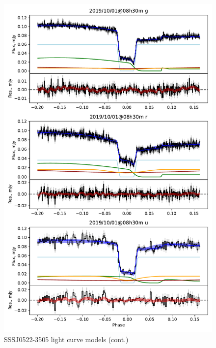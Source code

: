\begin{figure}
    \centering
    \includegraphics[width=\textwidth]{figures/results/three_cvs_with_weird_colours/SSS111126/SSS111126_2.pdf}
    \caption{SSSJ0522-3505 light curve models (cont.)}
    \label{fig:SSSJ0522-3505 all light curves cont 1}
\end{figure}
